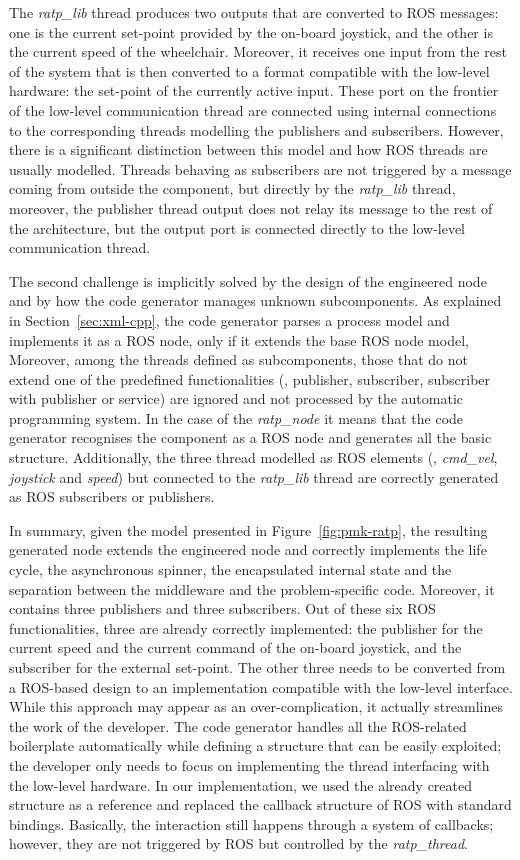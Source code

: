 The \textit{ratp\_lib} thread produces two outputs that are converted to ROS messages: one is the current set-point provided by the on-board joystick, and the other is the current speed of the wheelchair. Moreover, it receives one input from the rest of the system that is then converted to a format compatible with the low-level hardware: the set-point of the currently active input. These port on the frontier of the low-level communication thread are connected using internal connections to the corresponding threads modelling the publishers and subscribers. However, there is a significant distinction between this model and how ROS threads are usually modelled. Threads behaving as subscribers are not triggered by a message coming from outside the component, but directly by the \textit{ratp\_lib} thread, moreover, the publisher thread output does not relay its message to the rest of the architecture, but the output port is connected directly to the low-level communication thread.

The second challenge is implicitly solved by the design of the engineered node and by how the code generator manages unknown subcomponents.  As explained in Section~\ref{sec:xml-cpp}, the code generator parses a process model and implements it as a ROS node, only if it extends the base ROS node model, Moreover, among the threads defined as subcomponents, those that do not extend one of the predefined functionalities (\ie, publisher, subscriber, subscriber with publisher or service) are ignored and not processed by the automatic programming system. In the case of the \textit{ratp\_node} it means that the code generator recognises the component as a ROS node and generates all the basic structure. Additionally, the three thread modelled as ROS elements (\ie, \textit{cmd\_vel}, \textit{joystick} and \textit{speed}) but connected to the \textit{ratp\_lib} thread are correctly generated as ROS subscribers or publishers. 

In summary, given the model presented in Figure~\ref{fig:pmk-ratp}, the resulting generated node extends the engineered node and correctly implements the life cycle, the asynchronous spinner, the encapsulated internal state and the separation between the middleware and the problem-specific code. Moreover, it contains three publishers and three subscribers. Out of these six ROS functionalities, three are already correctly implemented: the publisher for the current speed and the current command of the on-board joystick, and the subscriber for the external set-point. The other three needs to be converted from a ROS-based design to an implementation compatible with the low-level interface. While this approach may appear as an over-complication, it actually streamlines the work of the developer. The code generator handles all the ROS-related boilerplate automatically while defining a structure that can be easily exploited; the developer only needs to focus on implementing the thread interfacing with the low-level hardware. In our implementation, we used the already created structure as a reference and replaced the callback structure of ROS with standard bindings. Basically, the interaction still happens through a system of callbacks; however, they are not triggered by ROS but controlled by the \textit{ratp\_thread}. 

